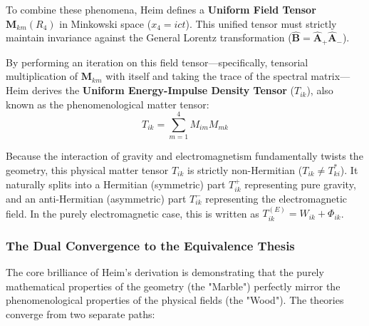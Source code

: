 \documentclass[11pt,a4paper,oneside]{article}
\begin{document}
To combine these phenomena, Heim defines a \textbf{Uniform Field Tensor} $\mathbf{M}_{km}(R_4)$ in Minkowski space ($x_4 = ict$). This unified tensor must strictly maintain invariance against the General Lorentz transformation ($\hat{\mathbf{B}} = \hat{\mathbf{A}}_+ \hat{\mathbf{A}}_-$). 

By performing an iteration on this field tensor—specifically, tensorial multiplication of $\mathbf{M}_{km}$ with itself and taking the trace of the spectral matrix—Heim derives the \textbf{Uniform Energy-Impulse Density Tensor} ($T_{ik}$), also known as the phenomenological matter tensor:
\begin{equation}
    T_{ik} = \sum_{m=1}^4 M_{im} M_{mk}
\end{equation}

Because the interaction of gravity and electromagnetism fundamentally twists the geometry, this physical matter tensor $T_{ik}$ is strictly non-Hermitian ($T_{ik} \neq T_{ki}^*$). It naturally splits into a Hermitian (symmetric) part $T_{ik}^+$ representing pure gravity, and an anti-Hermitian (asymmetric) part $T_{ik}^-$ representing the electromagnetic field. In the purely electromagnetic case, this is written as $T_{ik}^{(E)} = W_{ik} + \Phi_{ik}$.

\subsubsection{The Dual Convergence to the Equivalence Thesis}

The core brilliance of Heim's derivation is demonstrating that the purely mathematical properties of the geometry (the "Marble") perfectly mirror the phenomenological properties of the physical fields (the "Wood"). The theories converge from two separate paths:
\end{document}
